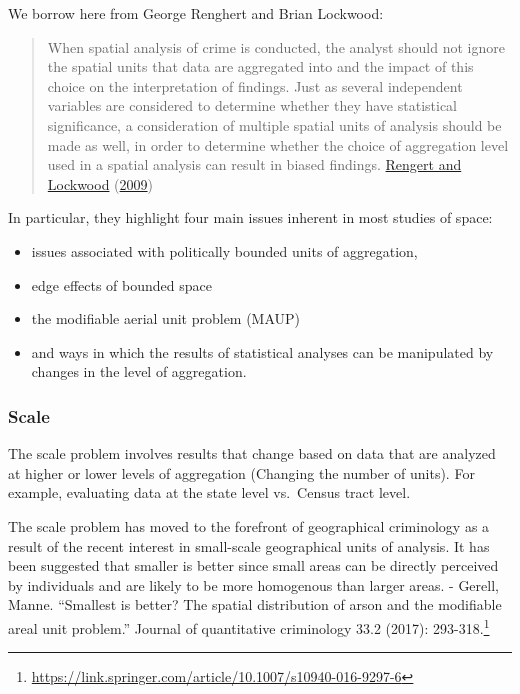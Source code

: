 \documentclass[
  krantz2]{krantz}
\providecommand{\tightlist}{%
  \setlength{\itemsep}{0pt}\setlength{\parskip}{0pt}}
\renewcommand{\href}[2]{#2\footnote{\url{#1}}}
\begin{document}
We borrow here from George Renghert and Brian Lockwood:

\begin{quote}
When spatial analysis of crime is conducted, the analyst should not ignore the spatial units that data are aggregated into and the impact of this choice on the interpretation of findings. Just as several independent variables are considered to determine whether they have statistical significance, a consideration of multiple spatial units of analysis should be made as well, in order to determine whether the choice of aggregation level used in a spatial analysis can result in biased findings. \protect\hyperlink{ref-Rengert_2009}{Rengert and Lockwood} (\protect\hyperlink{ref-Rengert_2009}{2009})
\end{quote}

In particular, they highlight four main issues inherent in most studies of space:

\begin{itemize}
\tightlist
\item
  issues associated with politically bounded units of aggregation,
\item
  edge effects of bounded space
\item
  the modifiable aerial unit problem (MAUP)
\item
  and ways in which the results of statistical analyses can be manipulated by changes in the level of
  aggregation.
\end{itemize}

\hypertarget{scale}{%
\subsubsection{Scale}\label{scale}}

The scale problem involves results that change based on data that are analyzed at higher or lower levels of aggregation (Changing the number of units). For example, evaluating data at the state level vs.~Census tract level.

The scale problem has moved to the forefront of geographical criminology as a result of the recent interest in small-scale geographical units of analysis. It has been suggested that smaller is better since small areas can be directly perceived by individuals and are likely to be more homogenous than larger areas.
- \href{https://link.springer.com/article/10.1007/s10940-016-9297-6}{Gerell, Manne. ``Smallest is better? The spatial distribution of arson and the modifiable areal unit problem.'' Journal of quantitative criminology 33.2 (2017): 293-318.}
\end{document}
